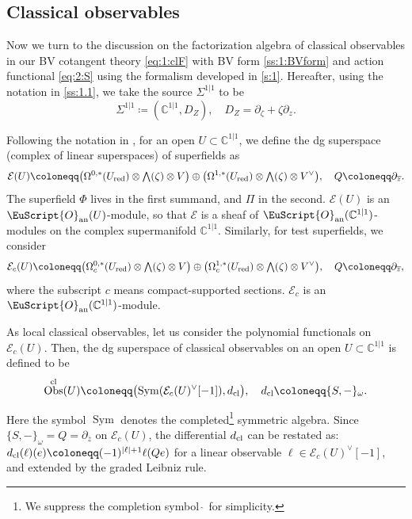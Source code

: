 \documentclass[final,reqno]{amsart}
\numberwithin{equation}{section}
\theoremstyle{definition}
\newcommand{\ol}{\overline}
\newcommand{\wh}{\widehat}
\newcommand{\ceq}{\coloneqq} %
\newcommand{\an}{\textup{an}}
\newcommand{\tcl}{\textup{cl}}
\newcommand{\tred}{\textup{red}}
\newcommand{\sC}{\mathbb{C}^{1|1}}
\newcommand{\clE}{\mathcal{E}}
\newcommand{\shO}{\EuScript{O}}
\newcommand{\pd}{\partial}
\newcommand{\sSig}{\Sigma^{1|1}}
\newcommand{\abs}[1]{\left| #1 \right|}
\newcommand{\cObs}[1]{\mathop{\Obs^{\textup{cl}}_{#1}}}
\DeclareMathOperator{\Sym}{Sym}
\DeclareMathOperator{\Obs}{Obs}
\DeclareMathOperator{\Wedge}{{\textstyle\bigwedge}}
\begin{document}
\subsection{Classical observables}\label{ss:2.6}

Now we turn to the discussion on the factorization algebra of 
classical observables in our BV cotangent theory \eqref{eq:1:clF} 
with BV form \eqref{ss:1:BVform} and action functional \eqref{eq:2:S}
using the formalism developed in \cref{s:1}.
Hereafter, using the notation in \cref{ss:1.1}, 
we take the source $\sSig$ to be
\[
 \sSig \ceq (\sC,D_Z), \quad D_Z = \pd_\zeta+\zeta\pd_z.
\]

Following the notation in \cite{CG1,CG2}, for an open $U \subset \sC$, 
we define the dg superspace (complex of linear superspaces) of superfields as 
\[
 \clE(U) \ceq 
 \bigl(\Omega^{0,*}(U_{\tred}) \otimes \Wedge(\zeta) \otimes V\bigr) \oplus
 \bigl(\Omega^{1,*}(U_{\tred}) \otimes \Wedge(\zeta) \otimes V^\vee\bigr),
 \quad 
 Q \ceq \pd_{\ol{z}}.
\]
The superfield $\Phi$ lives in the first summand, and $\Pi$ in the second.
$\clE(U)$ is an $\shO_{\an}(U)$-module, 
so that $\clE$ is a sheaf of $\shO_{\an}(\sC)$-modules 
on the complex supermanifold $\sC$.
Similarly, for test superfields, we consider 
\[
 \clE_c(U) \ceq 
 \bigl(\Omega_c^{0,*}(U_{\tred}) \otimes \Wedge(\zeta) \otimes V\bigr) \oplus
 \bigl(\Omega_c^{1,*}(U_{\tred}) \otimes \Wedge(\zeta) \otimes V^\vee\bigr),
 \quad 
 Q \ceq \pd_{\ol{z}},
\]
where the subscript $c$ means compact-supported sections.
$\clE_c$ is an $\shO_{\an}(\sC)$-module.

As local classical observables, 
let us consider the polynomial functionals on $\clE_c(U)$.
Then, the dg superspace of classical observables 
on an open $U \subset\sC$ is defined to be 
\begin{align}\label{eq:2:cObs}
 \cObs{}(U) \ceq \bigl( \Sym(\clE_c(U)^\vee[-1]), d_{\tcl}\bigr), \quad 
 d_{\tcl} \ceq \{S,-\}_\omega.
\end{align}
Here the symbol $\Sym$ denotes the completed\footnote{We suppress 
 the completion symbol $\wh{\ }$ for simplicity.} symmetric algebra. 
Since $\{S,-\}_\omega = Q = \pd_{\ol{z}}$ on $\clE_c(U)$, 
the differential $d_{\tcl}$ can be restated as: 
$d_{\tcl}(\ell)(e) \ceq (-1)^{\abs{\ell}+1}\ell(Qe)$ 
for a linear observable $\ell \in \clE_c(U)^\vee[-1]$, 
and extended by the graded Leibniz rule.
\end{document}
